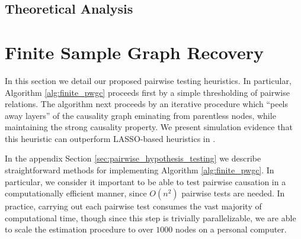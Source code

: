 \documentclass[12pt]{article}
\def\gcg{\mathcal{G}}  %
\begin{document}
\subsection{Theoretical Analysis}

\section{Finite Sample Graph Recovery}
\label{sec:structure_learning}
In this section we detail our proposed pairwise testing heuristics.
In particular, Algorithm \ref{alg:finite_pwgc} proceeds first by a
simple thresholding of pairwise relations.  The algorithm next
proceeds by an iterative procedure which ``peels away layers'' of the
causality graph eminating from parentless nodes, while maintaining the
strong causality property.  We present simulation evidence that this
heuristic can outperform LASSO-based heuristics in \cite{my_GC_paper}.

In the appendix Section \ref{sec:pairwise_hypothesis_testing} we describe
straightforward methods for implementing Algorithm
\ref{alg:finite_pwgc}.  In particular, we consider it important to be
able to test pairwise causation in a computationally efficient manner,
since $O(n^2)$ pairwise tests are needed.  In practice, carrying out
each pairwise test consumes the vast majority of computational time,
though since this step is trivially parallelizable, we are able to
scale the estimation procedure to over $1000$ nodes on a personal
computer.
\end{document}
